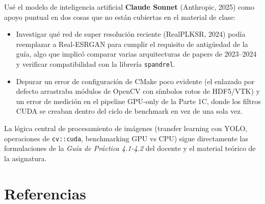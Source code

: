 \documentclass[12pt,a4paper]{article}
\begin{document}
Usé el modelo de inteligencia artificial \textbf{Claude Sonnet} (Anthropic, 2025) como apoyo puntual en dos cosas que no están cubiertas en el material de clase:

\begin{itemize}
  \item Investigar qué red de super resolución reciente (RealPLKSR, 2024) podía reemplazar a Real-ESRGAN para cumplir el requisito de antigüedad de la guía, algo que implicó comparar varias arquitecturas de papers de 2023--2024 y verificar compatibilidad con la librería \texttt{spandrel}.
  \item Depurar un error de configuración de CMake poco evidente (el enlazado por defecto arrastraba módulos de OpenCV con símbolos rotos de HDF5/VTK) y un error de medición en el pipeline GPU-only de la Parte 1C, donde los filtros CUDA se creaban dentro del ciclo de benchmark en vez de una sola vez.
\end{itemize}

La lógica central de procesamiento de imágenes (transfer learning con YOLO, operaciones de \texttt{cv::cuda}, benchmarking GPU vs CPU) sigue directamente las formulaciones de la \textit{Guía de Práctica 4.1-4.2} del docente y el material teórico de la asignatura.

\section*{Referencias}
\end{document}
